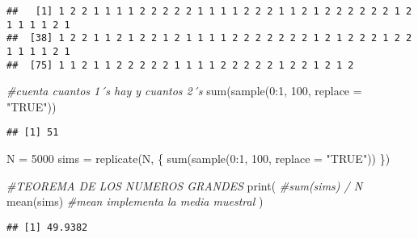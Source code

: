 \documentclass[
]{article}
\newenvironment{Shaded}{\begin{snugshade}}{\end{snugshade}}
\newcommand{\AttributeTok}[1]{\textcolor[rgb]{0.77,0.63,0.00}{#1}}
\newcommand{\CommentTok}[1]{\textcolor[rgb]{0.56,0.35,0.01}{\textit{#1}}}
\newcommand{\DecValTok}[1]{\textcolor[rgb]{0.00,0.00,0.81}{#1}}
\newcommand{\FunctionTok}[1]{\textcolor[rgb]{0.00,0.00,0.00}{#1}}
\newcommand{\NormalTok}[1]{#1}
\newcommand{\OtherTok}[1]{\textcolor[rgb]{0.56,0.35,0.01}{#1}}
\newcommand{\SpecialCharTok}[1]{\textcolor[rgb]{0.00,0.00,0.00}{#1}}
\newcommand{\StringTok}[1]{\textcolor[rgb]{0.31,0.60,0.02}{#1}}
\begin{document}
\begin{verbatim}
##   [1] 1 2 2 1 1 1 1 2 2 2 2 2 1 1 1 1 2 2 2 1 1 2 1 2 2 2 2 2 2 1 2 1 1 1 1 2 1
##  [38] 1 2 2 1 1 2 1 2 2 1 2 1 1 1 1 2 2 2 2 2 2 2 1 2 1 2 2 2 1 2 2 1 1 1 1 2 1
##  [75] 1 1 2 1 1 2 2 2 2 2 1 1 1 1 2 2 2 2 2 1 2 2 1 2 1 2
\end{verbatim}

\begin{Shaded}
\begin{Highlighting}[]
    \CommentTok{\#cuenta cuantos 1´s hay y cuantos 2´s }
    \FunctionTok{sum}\NormalTok{(}\FunctionTok{sample}\NormalTok{(}\DecValTok{0}\SpecialCharTok{:}\DecValTok{1}\NormalTok{, }\DecValTok{100}\NormalTok{, }\AttributeTok{replace =} \StringTok{"TRUE"}\NormalTok{))}
\end{Highlighting}
\end{Shaded}

\begin{verbatim}
## [1] 51
\end{verbatim}

\begin{Shaded}
\begin{Highlighting}[]
\NormalTok{    N }\OtherTok{=} \DecValTok{5000}
\NormalTok{   sims }\OtherTok{=}  \FunctionTok{replicate}\NormalTok{(N, \{}
      \FunctionTok{sum}\NormalTok{(}\FunctionTok{sample}\NormalTok{(}\DecValTok{0}\SpecialCharTok{:}\DecValTok{1}\NormalTok{, }\DecValTok{100}\NormalTok{, }\AttributeTok{replace =} \StringTok{"TRUE"}\NormalTok{))}
\NormalTok{    \})}
   
\CommentTok{\#TEOREMA DE LOS NUMEROS GRANDES}
  \FunctionTok{print}\NormalTok{(}
    \CommentTok{\#sum(sims) / N }
    \FunctionTok{mean}\NormalTok{(sims)  }\CommentTok{\#mean implementa la media muestral}
\NormalTok{  )}
\end{Highlighting}
\end{Shaded}

\begin{verbatim}
## [1] 49.9382
\end{verbatim}
\end{document}
